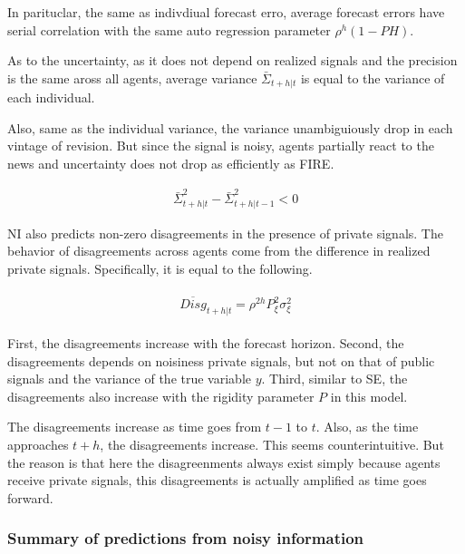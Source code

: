 \documentclass[]{article}
\begin{document}
In parituclar, the same as indivdiual forecast erro, average forecast errors have serial correlation with the same auto regression parameter $\rho^h(1-PH)$. 

As to the uncertainty, as it does not depend on realized signals and the precision is the same aross all agents, average variance $\bar \Sigma_{t+h|t}$ is equal to the variance of each individual. 

Also, same as the individual variance, the variance unambiguiously drop in each vintage of revision. But since the signal is noisy, agents partially react to the news and uncertainty does not drop as efficiently as FIRE. 

\begin{eqnarray}
\bar \Sigma^2_{t+h|t} -  \bar \Sigma^2_{t+h|t-1}< 0 
\end{eqnarray}

NI also predicts non-zero disagreements in the presence of private signals. The behavior of disagreements across agents come from the difference in realized private signals. Specifically, it is equal to the following. 

\begin{eqnarray}
\begin{aligned}
\overline {Disg}_{t+h|t} = \rho^{2h} P^2_\xi \sigma^2_\xi  
\end{aligned}
\end{eqnarray}

First, the disagreements increase with the forecast horizon.  Second, the disagreements depends on noisiness private signals, but not on that of public signals and the variance of the true variable $y$. Third, similar to SE, the disagreements also increase with the rigidity parameter $P$ in this model.

The disagreements increase as time goes from $t-1$ to $t$. Also, as the time approaches $t+h$, the disagreements increase. This seems counterintuitive. But the reason is that here the disagreenments always exist simply because agents receive private signals, this disagreements is actually amplified as time goes forward. 


\subsubsection{Summary of predictions from noisy information}
\end{document}

